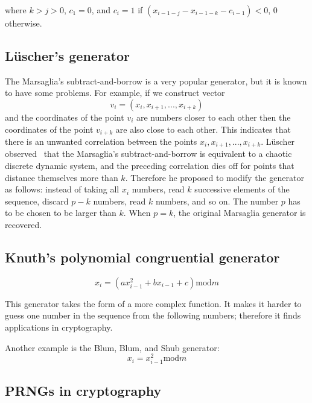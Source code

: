 \documentclass[justified,sixbynine]{tufte-book}
\theoremstyle{plain}%
\theoremstyle{definition}
\theoremstyle{remark}
\begin{document}
\begin{fullwidth}
where $k>j>0$, $c_1=0$, and $c_i=1$ if $(x_{i-1-j}-x_{i-1-k}-c_{i-1})<0$, $0$
otherwise.

\goodbreak\subsection{L\"uscher's generator}

The Marsaglia's subtract-and-borrow is a very popular generator, but it is known
to have some problems. For example, if we construct vector
\begin{equation}
v_i=(x_i,x_{i+1},...,x_{i+k})
\end{equation}
and the coordinates of the point $v_i$ are numbers closer to each other then
the coordinates of the point $v_{i+k}$ are also close to each other. This
indicates that there is an unwanted correlation between the points $%
x_i,x_{i+1},...,x_{i+k}$. L\"uscher observed~\cite{lusher} that the Marsaglia's
subtract-and-borrow is equivalent to a chaotic discrete dynamic system, and
the preceding correlation dies off for points that distance themselves more than $k$. Therefore
he proposed to modify the generator as follows: instead of taking all $x_i$
numbers, read $k$ successive elements of the sequence, discard $p-k$
numbers, read $k$ numbers, and so on. The number $p$ has to be chosen to be
larger than $k$. When $p=k$, the original Marsaglia generator is recovered.

\goodbreak\subsection{Knuth's polynomial congruential generator}

\begin{equation}
x_i=(ax_{i-1}^2+bx_{i-1}+c)\textrm{mod}m
\end{equation}

This generator takes the form of a more complex function. It makes it harder to guess one number in the sequence from the following numbers; therefore
it finds applications in cryptography.

Another example is the Blum, Blum, and Shub generator:
\begin{equation}
x_i=x_{i-1}^2\textrm{mod}m
\end{equation}

\goodbreak\subsection{PRNGs in cryptography}


\end{fullwidth}
\end{document}
